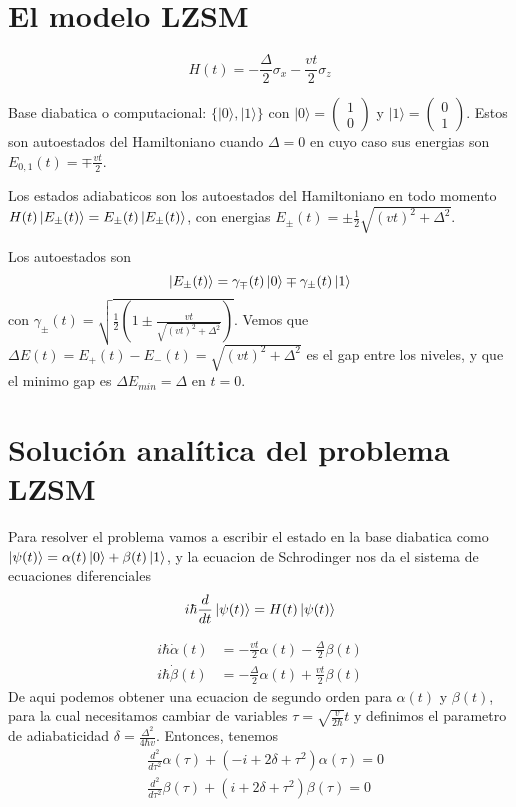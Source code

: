 \section{El modelo LZSM}

\begin{equation}
H(t) = -\frac{\Delta}{2}\sigma_x - \frac{vt}{2}\sigma_z
\end{equation}

Base diabatica o computacional: $\{|0\rangle, |1\rangle\}$ con $|0\rangle = \begin{pmatrix}1 \\ 0\end{pmatrix}$ y $|1\rangle = \begin{pmatrix}0 \\ 1\end{pmatrix}$.
Estos son autoestados del Hamiltoniano cuando $\Delta=0$ en cuyo caso sus energias son $E_{0,1}(t)=\mp \frac{vt}{2}$.

Los estados adiabaticos son los autoestados del Hamiltoniano en todo momento $H(t)\ket{E_\pm(t)}=E_\pm(t)\ket{E_\pm(t)}$, con energias $E_\pm(t) = \pm \frac{1}{2}\sqrt{(vt)^2 + \Delta^2}$.

Los autoestados son 
\begin{equation}
    \ket{E_\pm(t)}=\gamma_\mp(t)\ket{0}\mp \gamma_\pm(t)\ket{1}
\end{equation}
con $\gamma_\pm(t)=\sqrt{\frac{1}{2}\left(1\pm \frac{vt}{\sqrt{(vt)^2+\Delta^2}}\right)}$. Vemos que $\Delta E(t)=E_+(t)-E_-(t)=\sqrt{(vt)^2+\Delta^2}$ es el gap entre los niveles, y que el minimo gap es $\Delta E_{min}=\Delta$ en $t=0$.

\section{Solución analítica del problema LZSM}

Para resolver el problema vamos a escribir el estado en la base diabatica como $\ket{\psi(t)}=\alpha(t)\ket{0}+\beta(t)\ket{1}$, y la ecuacion de Schrodinger nos da el sistema de ecuaciones diferenciales
\begin{equation}
    i\hbar\frac{d}{dt}\ket{\psi(t)}=H(t)\ket{\psi(t)}
\end{equation}

\begin{align}
    i\hbar\dot{\alpha}(t) &= -\frac{vt}{2}\alpha(t) - \frac{\Delta}{2}\beta(t) \\
    i\hbar\dot{\beta}(t) &= -\frac{\Delta}{2}\alpha(t) + \frac{vt}{2}\beta(t)
\end{align}
De aqui podemos obtener una ecuacion de segundo orden para $\alpha(t)$ y $\beta(t)$, para la cual necesitamos cambiar de variables $\tau = \sqrt{\frac{v}{2\hbar}}t$ y definimos el parametro de adiabaticidad $\delta=\frac{\Delta^2}{4 \hbar v}$. Entonces, tenemos
\begin{align}
    & \frac{d^2}{d\tau^2}\alpha(\tau) + \left(-i + 2\delta + \tau^2\right)\alpha(\tau) = 0 \\
    & \frac{d^2}{d\tau^2}\beta(\tau) + \left(i + 2\delta + \tau^2\right)\beta(\tau) = 0
\end{align}

